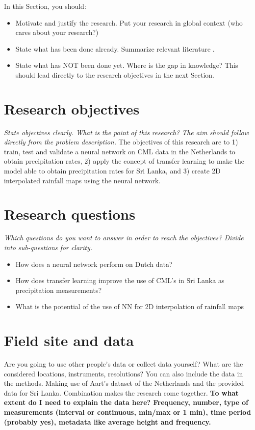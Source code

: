 \documentclass[twocolumn, 10pt, a4paper]{article}
\begin{document}
	In this Section, you should:
	\begin{itemize}
		\item Motivate and justify the research. Put your research in global context (who cares about your research?)
		\item State what has been done already. Summarize relevant literature \cite{Overeem2011}.
		\item State what has NOT been done yet. Where is the gap in knowledge? This should lead directly to the research objectives in the next Section.
	\end{itemize}
	
	\section{Research objectives}
	
	\textit{State objectives clearly. What is the point of this research? The aim should follow directly from the problem description.}
	The objectives of this research are to 1) train, test and validate a neural network on CML data in the Netherlands to obtain precipitation rates, 2) apply the concept of transfer learning to make the model able to obtain precipitation rates for Sri Lanka, and 3) create 2D interpolated rainfall maps using the neural network.
	 
	
	\section{Research questions}
	
	\textit{Which questions do you want to answer in order to reach the objectives? Divide into sub-questions for clarity.}
	\begin{itemize}
		\item How does a neural network perform on Dutch data?
		\item How does transfer learning improve the use of CML's in Sri Lanka as precipitation measurements?
		\item What is the potential of the use of NN for 2D interpolation of rainfall maps
	\end{itemize}
	
	
	\section{Field site and data}
	
	Are you going to use other people's data or collect data yourself? What are the considered locations, instruments, resolutions? You can also include the data in the methods.
	Making use of Aart's dataset of the Netherlands and the provided data for Sri Lanka. Combination makes the research come together. \textbf{To what extent do I need to explain the data here? Frequency, number, type of measurements (interval or continuous, min/max or 1 min), time period (probably yes), metadata like average height and frequency.}
	
\end{document}
